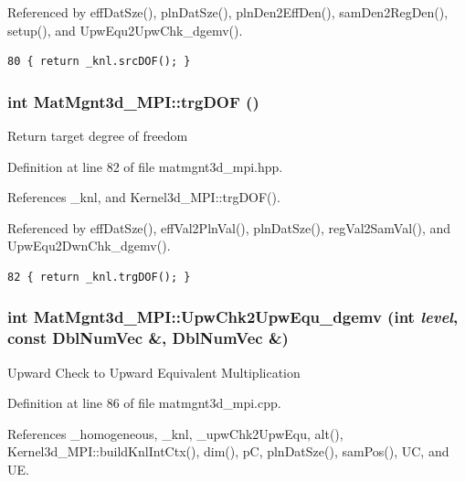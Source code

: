 Referenced by eff\-Dat\-Sze(), pln\-Dat\-Sze(), pln\-Den2Eff\-Den(), sam\-Den2Reg\-Den(), setup(), and Upw\-Equ2Upw\-Chk\_\-dgemv().

\footnotesize\begin{verbatim}80 { return _knl.srcDOF(); }
\end{verbatim}\normalsize 


\subsubsection{\setlength{\rightskip}{0pt plus 5cm}int Mat\-Mgnt3d\_\-MPI::trg\-DOF ()\hspace{0.3cm}{\tt  [inline]}}\label{classMatMgnt3d__MPI_ea43c1f768349e86110e4e2d06e38d10_ea43c1f768349e86110e4e2d06e38d10}


Return target degree of freedom 

Definition at line 82 of file matmgnt3d\_\-mpi.hpp.

References \_\-knl, and Kernel3d\_\-MPI::trg\-DOF().

Referenced by eff\-Dat\-Sze(), eff\-Val2Pln\-Val(), pln\-Dat\-Sze(), reg\-Val2Sam\-Val(), and Upw\-Equ2Dwn\-Chk\_\-dgemv().

\footnotesize\begin{verbatim}82 { return _knl.trgDOF(); }
\end{verbatim}\normalsize 


\subsubsection{\setlength{\rightskip}{0pt plus 5cm}int Mat\-Mgnt3d\_\-MPI::Upw\-Chk2Upw\-Equ\_\-dgemv (int {\em level}, const Dbl\-Num\-Vec \&, Dbl\-Num\-Vec \&)}\label{classMatMgnt3d__MPI_6b9d3c2c722c190a882a82cef0429893_6b9d3c2c722c190a882a82cef0429893}


Upward Check to Upward Equivalent Multiplication 

Definition at line 86 of file matmgnt3d\_\-mpi.cpp.

References \_\-homogeneous, \_\-knl, \_\-upw\-Chk2Upw\-Equ, alt(), Kernel3d\_\-MPI::build\-Knl\-Int\-Ctx(), dim(), p\-C, pln\-Dat\-Sze(), sam\-Pos(), UC, and UE.

